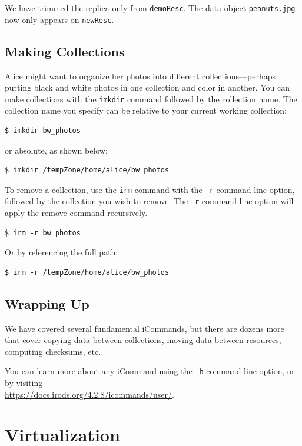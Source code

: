 \documentclass[10pt,oneside]{memoir}
\begin{document}
We have trimmed the replica only from \texttt{demoResc}. The data object \texttt{peanuts.jpg} now only appears on \texttt{newResc}.

\section{Making Collections}

Alice might want to organize her photos into different collections---perhaps putting black and white photos in one collection and color in another. You can make collections with the \texttt{imkdir} command followed by the collection name. The collection name you specify can be relative to your current working collection:

\begin{lstlisting}
$ imkdir bw_photos
\end{lstlisting}

or absolute, as shown below:

\begin{lstlisting}
$ imkdir /tempZone/home/alice/bw_photos
\end{lstlisting}

To remove a collection, use the \texttt{irm} command with the \texttt{-r} command line option, followed by the collection you wish to remove. The \texttt{-r} command line option will apply the remove command recursively.

\begin{lstlisting}
$ irm -r bw_photos
\end{lstlisting}

Or by referencing the full path:

\begin{lstlisting}
$ irm -r /tempZone/home/alice/bw_photos
\end{lstlisting}

\section{Wrapping Up}

We have covered several fundamental iCommands, but there are dozens more that cover copying data between collections, moving data between resources, computing checksums, etc.

You can learn more about any iCommand using the \texttt{-h} command line option, or by visiting \\
\url{https://docs.irods.org/4.2.8/icommands/user/}.

\chapter{Virtualization}
\end{document}
